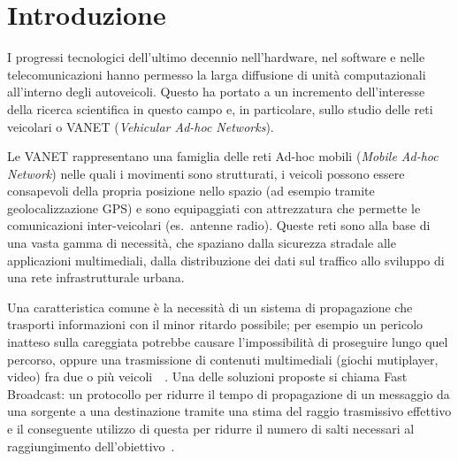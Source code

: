 
\chapter{Introduzione}\label{chap:introduction}
I progressi tecnologici dell'ultimo decennio nell'hardware, nel software e nelle telecomunicazioni hanno permesso
la larga diffusione di unità computazionali all'interno degli autoveicoli.%
Questo ha portato a un incremento dell'interesse della ricerca scientifica in questo campo e, in particolare,
sullo studio delle reti veicolari o VANET (\textit{Vehicular Ad-hoc Networks}).

Le VANET rappresentano una famiglia delle reti Ad-hoc mobili (\textit{Mobile Ad-hoc Network})
nelle quali i movimenti sono strutturati, i veicoli possono essere consapevoli della propria posizione nello spazio (ad esempio tramite geolocalizzazione GPS)
e sono equipaggiati con attrezzatura che permette le comunicazioni inter-veicolari (es.~antenne radio).
Queste reti sono alla base di una vasta gamma di necessità, che spaziano dalla sicurezza stradale alle applicazioni multimediali,
dalla distribuzione dei dati sul traffico allo sviluppo di una rete infrastrutturale urbana.

Una caratteristica comune è la necessità di un sistema di propagazione che trasporti informazioni
con il minor ritardo possibile; per esempio un pericolo inatteso sulla careggiata potrebbe causare l'impossibilità di proseguire
lungo quel percorso, oppure una trasmissione di contenuti multimediali (giochi mutiplayer, video) fra due o più veicoli~\cite{1580935}~\cite{PantelW02}.
Una delle soluzioni proposte si chiama Fast Broadcast: un protocollo per ridurre il tempo di propagazione
di un messaggio da una sorgente a una destinazione tramite una stima del raggio trasmissivo effettivo e
il conseguente utilizzo di questa per ridurre il numero di salti necessari al raggiungimento dell'obiettivo~\cite{Palazzi07howdo}.

